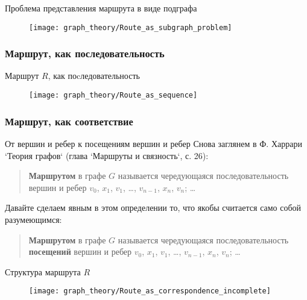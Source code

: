 \begin{frame}{Проблема представления маршрута в виде подграфа}
  \begin{figure}
    \centering
    \texttt{[image: graph\_theory/Route\_as\_subgraph\_problem]}
  \end{figure}
\end{frame}

\subsubsection{Маршрут, как последовательность}

\begin{frame}{Маршрут $R$, как поcледовательность}
  \begin{figure}
    \centering
    \texttt{[image: graph\_theory/Route\_as\_sequence]}
  \end{figure}
\end{frame}

\subsubsection{Маршрут, как соответствие}

\begin{frame}{От вершин и ребер к посещениям вершин и ребер}
  Снова заглянем в Ф. Харрари `Теория графов` (глава `Маршруты и связность`, с. 26):
  \begin{quote}
    \textbf{Маршрутом} в графе $G$ называется чередующаяся последовательность
    вершин и ребер $v_0$, $x_1$, $v_1$, \dots, $v_{n-1}$, $x_n$, $v_n$; \dots
  \end{quote}

  Давайте сделаем явным в этом определении то, что якобы считается
  само собой разумеющимся:
  \begin{quote}
    \textbf{Маршрутом} в графе $G$ называется чередующаяся последовательность \textbf{посещений}
    вершин и ребер $v_0$, $x_1$, $v_1$, \dots, $v_{n-1}$, $x_n$, $v_n$; \dots
  \end{quote}
\end{frame}

\begin{frame}{Структура маршрута $R$}
  \begin{figure}
    \centering
    \texttt{[image: graph\_theory/Route\_as\_correspondence\_incomplete]}
  \end{figure}
\end{frame}

